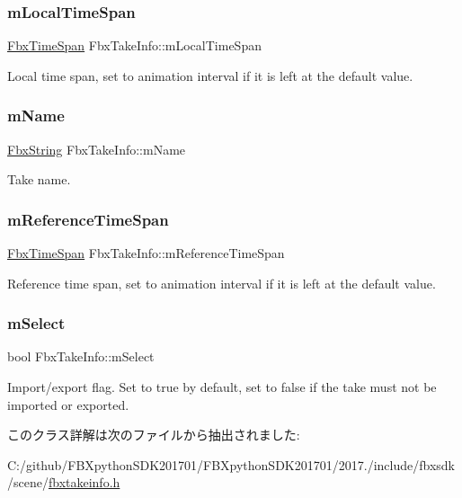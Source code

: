 \subsubsection{\texorpdfstring{m\+Local\+Time\+Span}{mLocalTimeSpan}}
{\footnotesize\ttfamily \hyperlink{class_fbx_time_span}{Fbx\+Time\+Span} Fbx\+Take\+Info\+::m\+Local\+Time\+Span}



Local time span, set to animation interval if it is left at the default value. 

\mbox{\label{class_fbx_take_info_ac505b495f047d57eda55340f699f583e}} 
\subsubsection{\texorpdfstring{m\+Name}{mName}}
{\footnotesize\ttfamily \hyperlink{class_fbx_string}{Fbx\+String} Fbx\+Take\+Info\+::m\+Name}



Take name. 

\mbox{\label{class_fbx_take_info_a26d1e723fc0e32e88b38a1aafbdf8665}} 
\subsubsection{\texorpdfstring{m\+Reference\+Time\+Span}{mReferenceTimeSpan}}
{\footnotesize\ttfamily \hyperlink{class_fbx_time_span}{Fbx\+Time\+Span} Fbx\+Take\+Info\+::m\+Reference\+Time\+Span}



Reference time span, set to animation interval if it is left at the default value. 

\mbox{\label{class_fbx_take_info_a0e239e6f052b3d5cbccbeb85669d9a63}} 
\subsubsection{\texorpdfstring{m\+Select}{mSelect}}
{\footnotesize\ttfamily bool Fbx\+Take\+Info\+::m\+Select}

Import/export flag. Set to {\ttfamily true} by default, set to {\ttfamily false} if the take must not be imported or exported. 

このクラス詳解は次のファイルから抽出されました\+:\begin{DoxyCompactItemize}
\item 
C\+:/github/\+F\+B\+Xpython\+S\+D\+K201701/\+F\+B\+Xpython\+S\+D\+K201701/2017./include/fbxsdk/scene/\hyperlink{fbxtakeinfo_8h}{fbxtakeinfo.\+h}\end{DoxyCompactItemize}

